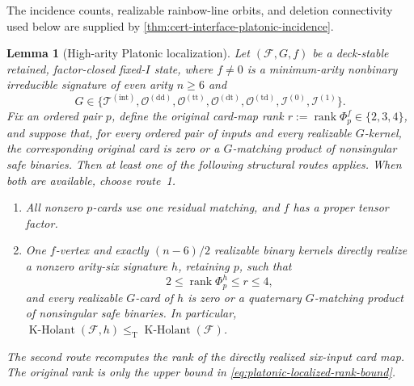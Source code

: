 \documentclass[11pt,letterpaper,onecolumn]{article}
\theoremstyle{plain}
\newtheorem{lemma}[lemma]{Lemma}
\theoremstyle{definition}
\theoremstyle{remark}
\newcommand{\cF}{\mathcal F}
\newcommand{\KHolant}{\operatorname{K\text{-}Holant}}
\newcommand{\TetInt}{{\mathcal T^{(\mathrm{int})}}}
\newcommand{\OctDD}{{\mathcal O^{(\mathrm{dd})}}}
\newcommand{\OctTT}{{\mathcal O^{(\mathrm{tt})}}}
\newcommand{\OctDT}{{\mathcal O^{(\mathrm{dt})}}}
\newcommand{\OctTD}{{\mathcal O^{(\mathrm{td})}}}
\newcommand{\IcoZero}{{\mathcal I^{(0)}}}
\newcommand{\IcoOne}{{\mathcal I^{(1)}}}
\newcommand{\rank}{\operatorname{rank}}
\newcommand{\leT}{\leq_{\mathrm T}}
\begin{document}
The incidence counts, realizable rainbow-line orbits, and deletion
connectivity used below are supplied by
\cref{thm:cert-interface-platonic-incidence}.

\begin{lemma}[High-arity Platonic localization]
\label{lem:platonic-high-arity-localization}
Let \((\cF,G,f)\) be a deck-stable retained, factor-closed fixed-\(I\)
state, where \(f\ne0\) is a minimum-arity nonbinary irreducible signature
of even arity \(n\ge6\) and
\[
 G\in\{\TetInt,\OctDD,\OctTT,\OctDT,
          \OctTD,\IcoZero,\IcoOne\}.
\]
Fix an ordered pair \(p\), define the original card-map rank
\(r:=\rank\Phi_p^f\in\{2,3,4\}\), and
suppose that, for every ordered pair of inputs and every realizable
\(G\)-kernel, the corresponding original card is zero or a \(G\)-matching product of nonsingular safe binaries.  Then at least one of the following structural
routes applies. When both are available, choose route~1.
\begin{enumerate}
\item All nonzero \(p\)-cards use one residual matching, and
      \(f\) has a proper tensor factor.
\item One \(f\)-vertex and exactly \((n-6)/2\) realizable binary kernels
      directly realize a nonzero arity-six signature \(h\), retaining
      \(p\), such that
      \begin{equation}
        2\le\rank\Phi_p^h\le r\le4,
        \label{eq:platonic-localized-rank-bound}
      \end{equation}
      and every realizable \(G\)-card of \(h\) is zero or a quaternary \(G\)-matching product of nonsingular safe binaries.  In particular,
      \(\KHolant(\cF,h)\leT\KHolant(\cF)\).
\end{enumerate}
The second route recomputes the rank of the directly realized six-input card map.
The original rank is only the upper bound in
\cref{eq:platonic-localized-rank-bound}.
\end{lemma}
\end{document}
